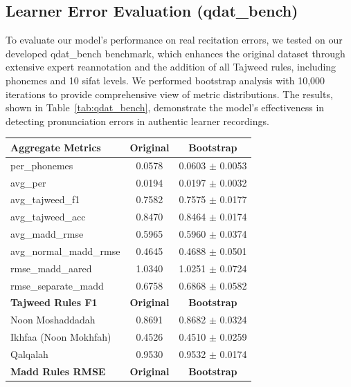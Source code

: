 \subsection{Learner Error Evaluation (qdat\_bench)}
To evaluate our model's performance on real recitation errors, we tested on our developed qdat\_bench benchmark, which enhances the original \cite{osman2021qdat} dataset through extensive expert reannotation and the addition of all Tajweed rules, including phonemes and 10 sifat levels. We performed bootstrap analysis with 10,000 iterations to provide comprehensive view of metric distributions. The results, shown in Table~\ref{tab:qdat_bench}, demonstrate the model's effectiveness in detecting pronunciation errors in authentic learner recordings.

\begin{table}[htbp]
	\centering
	\small
	\begin{tabular}{lcc}
		\hline
		\textbf{Aggregate Metrics} & \textbf{Original} & \textbf{Bootstrap} \\
		\hline
		per\_phonemes              & 0.0578            & 0.0603 $\pm$ 0.0053           \\
		avg\_per                   & 0.0194            & 0.0197 $\pm$ 0.0032           \\
		avg\_tajweed\_f1           & 0.7582            & 0.7575 $\pm$ 0.0177           \\
		avg\_tajweed\_acc          & 0.8470            & 0.8464 $\pm$ 0.0174           \\
		avg\_madd\_rmse            & 0.5965            & 0.5960 $\pm$ 0.0374           \\
		avg\_normal\_madd\_rmse    & 0.4645            & 0.4688 $\pm$ 0.0501           \\
		rmse\_madd\_aared          & 1.0340            & 1.0251 $\pm$ 0.0724           \\
		rmse\_separate\_madd       & 0.6758            & 0.6868 $\pm$ 0.0582           \\
		\hline
		\textbf{Tajweed Rules F1}  & \textbf{Original} & \textbf{Bootstrap} \\
		\hline
		Noon Moshaddadah           & 0.8691            & 0.8682 $\pm$ 0.0324           \\
		Ikhfaa (Noon Mokhfah)      & 0.4526            & 0.4510 $\pm$ 0.0259           \\
		Qalqalah                   & 0.9530            & 0.9532 $\pm$ 0.0174           \\
		\hline
		\textbf{Madd Rules RMSE}   & \textbf{Original} & \textbf{Bootstrap} \\

\end{tabular}
\end{table}
